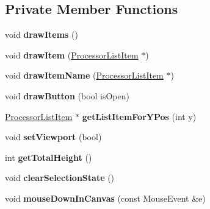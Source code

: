 \subsection*{Private Member Functions}
\begin{DoxyCompactItemize}
\item 
\hypertarget{classProcessorList_a842f29d228a69d183b9b503ebef4cda4}{void {\bfseries draw\-Items} ()}\label{classProcessorList_a842f29d228a69d183b9b503ebef4cda4}

\item 
\hypertarget{classProcessorList_a74d7820267f0275ae81461e7f2c6e29c}{void {\bfseries draw\-Item} (\hyperlink{classProcessorListItem}{Processor\-List\-Item} $\ast$)}\label{classProcessorList_a74d7820267f0275ae81461e7f2c6e29c}

\item 
\hypertarget{classProcessorList_a049a24772e4088a9be29cc9bada12280}{void {\bfseries draw\-Item\-Name} (\hyperlink{classProcessorListItem}{Processor\-List\-Item} $\ast$)}\label{classProcessorList_a049a24772e4088a9be29cc9bada12280}

\item 
\hypertarget{classProcessorList_a20bb75ee2f2543927d4a4caa01f73203}{void {\bfseries draw\-Button} (bool is\-Open)}\label{classProcessorList_a20bb75ee2f2543927d4a4caa01f73203}

\item 
\hypertarget{classProcessorList_a3a2eb03367b34206483307555a0b28f2}{\hyperlink{classProcessorListItem}{Processor\-List\-Item} $\ast$ {\bfseries get\-List\-Item\-For\-Y\-Pos} (int y)}\label{classProcessorList_a3a2eb03367b34206483307555a0b28f2}

\item 
\hypertarget{classProcessorList_a42feb966830ce411e2b6a2ab8a4915b5}{void {\bfseries set\-Viewport} (bool)}\label{classProcessorList_a42feb966830ce411e2b6a2ab8a4915b5}

\item 
\hypertarget{classProcessorList_a0a16364cdfd8d6bf5f706629b325ff84}{int {\bfseries get\-Total\-Height} ()}\label{classProcessorList_a0a16364cdfd8d6bf5f706629b325ff84}

\item 
\hypertarget{classProcessorList_ae5a0d9e43c404e6b5c234c68b65eefb7}{void {\bfseries clear\-Selection\-State} ()}\label{classProcessorList_ae5a0d9e43c404e6b5c234c68b65eefb7}

\item 
\hypertarget{classProcessorList_ad744b9c8c775e77fc1d23194b4e7b93b}{void {\bfseries mouse\-Down\-In\-Canvas} (const Mouse\-Event \&e)}\label{classProcessorList_ad744b9c8c775e77fc1d23194b4e7b93b}


\end{DoxyCompactItemize}

